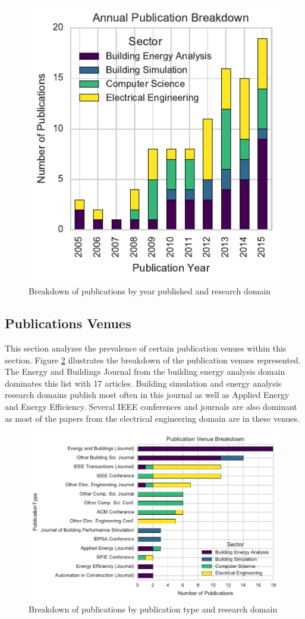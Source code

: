 \begin{figure}[ht!]
\begin{center}
\includegraphics[width=0.5599999999999999\columnwidth]{figures/PublicationYear/PublicationYear}
\caption{Breakdown of publications by year published and research domain
\label{fig:yearbreakdown}%
}
\end{center}
\end{figure}

\subsection{Publications Venues}
This section analyzes the prevalence of certain publication venues within this section. Figure \ref{fig:journalbreakdown} illustrates the breakdown of the publication venues represented. The Energy and Buildings Journal from the building energy analysis domain dominates this list with 17 articles. Building simulation and energy analysis research domains publish most often in this journal as well as Applied Energy and Energy Efficiency. Several IEEE conferences and journals are also dominant as most of the papers from the electrical engineering domain are in these venues.

\begin{figure}[ht!]
\begin{center}
\includegraphics[width=1\columnwidth]{figures/PublicationVenues/PublicationVenues}
\caption{Breakdown of publications by publication type and research domain
\label{fig:journalbreakdown}%
}
\end{center}
\end{figure}

